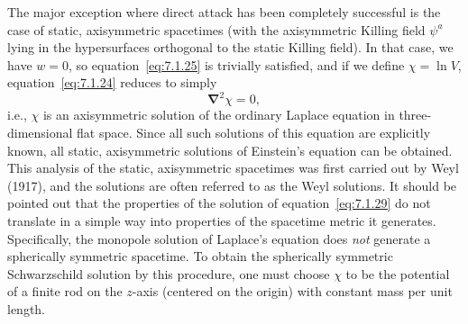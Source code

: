 The major exception where direct attack has been completely successful is the case
of static, axisymmetric spacetimes (with the axisymmetric Killing field \(\psi^a\)
lying in the hypersurfaces orthogonal to the static Killing field). In that case, we
have \(w=0\), so equation~\eqref{eq:7.1.25} is trivially satisfied, and if we define
\(\chi=\ln V\), equation~\eqref{eq:7.1.24} reduces to simply
\begin{equation}
  \boldsymbol{\nabla}^2\chi=0 ,
  \tag{7.1.29}\label{eq:7.1.29}
\end{equation}
i.e., \(\chi\) is an axisymmetric solution of the ordinary Laplace equation in
three-dimensional flat space. Since all such solutions of this equation are explicitly
known, all static, axisymmetric solutions of Einstein's equation can be obtained.
This analysis of the static, axisymmetric spacetimes was first carried out by Weyl
(1917), and the solutions are often referred to as the Weyl solutions. It should be
pointed out that the properties of the solution of equation~\eqref{eq:7.1.29} do not
translate in a simple way into properties of the spacetime metric it generates.
Specifically, the monopole solution of Laplace's equation does \emph{not} generate
a spherically symmetric spacetime. To obtain the spherically symmetric
Schwarzschild solution by this procedure, one must choose \(\chi\) to be the
potential of a finite rod on the \(z\)-axis (centered on the origin) with constant mass
per unit length.

